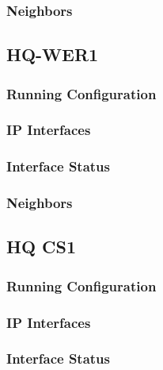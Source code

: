 \subsubsection{Neighbors}


\subsection{HQ-WER1}
\subsubsection{Running Configuration}


\subsubsection{IP Interfaces}


\subsubsection{Interface Status}


\subsubsection{Neighbors}


\subsection{HQ CS1}
\subsubsection{Running Configuration}


\subsubsection{IP Interfaces}


\subsubsection{Interface Status}


